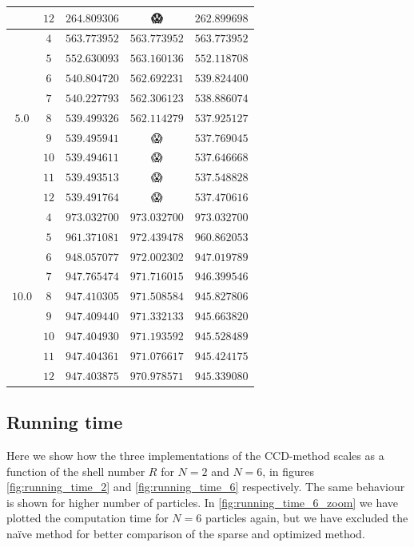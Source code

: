 \documentclass[
    a4paper, aps, twocolumn, floatfix, superscriptaddress,
    nofootinbib]{revtex4-1}
\newcommand{\nan}{{\DejaSans 😱}}
\newcommand{\1}{\mathds{1}}
\begin{document}
\begin{table}
\begin{ruledtabular}
\begin{tabular}{c|c|ccc}
                          & $12$ & $264.809306$ & \nan & $262.899698$ \\
                    \hline
                          & $4$ & $563.773952$ & $563.773952$ & $563.773952$ \\
                          & $5$ & $552.630093$ & $563.160136$ & $552.118708$ \\
                          & $6$ & $540.804720$ & $562.692231$ & $539.824400$ \\
                          & $7$ & $540.227793$ & $562.306123$ & $538.886074$ \\
                    $5.0$ & $8$ & $539.499326$ & $562.114279$ & $537.925127$ \\
                          & $9$ & $539.495941$ & \nan & $537.769045$ \\
                          & $10$ & $539.494611$ & \nan & $537.646668$ \\
                          & $11$ & $539.493513$ & \nan & $537.548828$ \\
                          & $12$ & $539.491764$ & \nan & $537.470616$ \\
                    \hline
                           & $4$ & $973.032700$ & $973.032700$ & $973.032700$ \\
                           & $5$ & $961.371081$ & $972.439478$ & $960.862053$ \\
                           & $6$ & $948.057077$ & $972.002302$ & $947.019789$ \\
                           & $7$ & $947.765474$ & $971.716015$ & $946.399546$ \\
                    $10.0$ & $8$ & $947.410305$ & $971.508584$ & $945.827806$ \\
                           & $9$ & $947.409440$ & $971.332133$ & $945.663820$ \\
                           & $10$ & $947.404930$ & $971.193592$ & $945.528489$ \\
                           & $11$ & $947.404361$ & $971.076617$ & $945.424175$ \\
                           & $12$ & $947.403875$ & $970.978571$ & $945.339080$ \\
                \end{tabular}
            \end{ruledtabular}
            \label{tab:N20}
        \end{table}

    \subsection{Running time}
        Here we show how the three implementations of the CCD-method scales as a
        function of the shell number $R$ for $N = 2$ and $N = 6$, in figures
        \ref{fig:running_time_2} and \ref{fig:running_time_6} respectively. The
        same behaviour is shown for higher number of particles. In
        \autoref{fig:running_time_6_zoom} we have plotted the computation time
        for $N=6$ particles again, but we have excluded the naïve method for
        better comparison of the sparse and optimized method.
\end{document}
